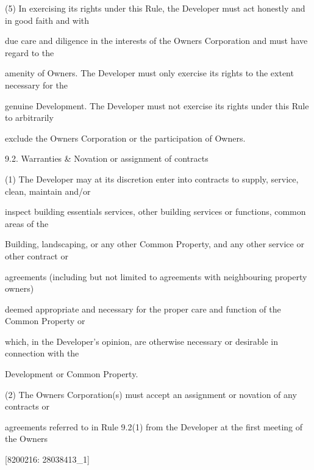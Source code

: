 \documentclass{article}
\begin{document}
{\fontsize{9.962}{1}(5) In exercising its rights under this Rule, the Developer must act honestly and in good faith and with }

{\fontsize{10.02}{1}due care and diligence in the interests of the Owners Corporation and must have regard to the }

{\fontsize{10.02}{1}amenity of Owners. The Developer must only exercise its rights to the extent necessary for the }

{\fontsize{10.02}{1}genuine Development. The Developer must not exercise its rights under this Rule to arbitrarily }

{\fontsize{10.02}{1}exclude the Owners Corporation or the participation of Owners. }

{\fontsize{9.99}{1}9.2. Warranties \& Novation or assignment of contracts }

{\fontsize{9.962}{1}(1) The Developer may at its discretion enter into contracts to supply, service, clean, maintain and/or }

{\fontsize{10.02}{1}inspect building essentials services, other building services or functions, common areas of the }

{\fontsize{10.02}{1}Building, landscaping, or any other Common Property, and any other service or other contract or }

{\fontsize{10.02}{1}agreements (including but not limited to agreements with neighbouring property owners) }

{\fontsize{10.02}{1}deemed appropriate and necessary for the proper care and function of the Common Property or }

{\fontsize{10.02}{1}which, in the Developer’s opinion, are otherwise necessary or desirable in connection with the }

{\fontsize{10.02}{1}Development or Common Property. }

{\fontsize{9.962}{1}(2) The Owners Corporation(s) must accept an assignment or novation of any contracts or }

{\fontsize{10.02}{1}agreements referred to in Rule 9.2(1) from the Developer at the first meeting of the Owners }

\newpage
















{\fontsize{7.02}{1}[8200216: 28038413\_1] }
\end{document}

